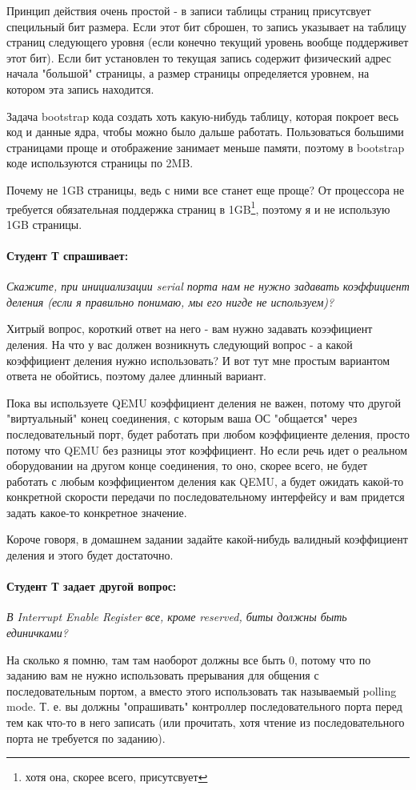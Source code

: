 Принцип действия очень простой - в записи таблицы страниц присутсвует специльный
бит размера. Если этот бит сброшен, то запись указывает на таблицу страниц
следующего уровня (если конечно текущий уровень вообще поддерживет этот бит).
Если бит установлен то текущая запись содержит физический адрес начала "большой"
страницы, а размер страницы определяется уровнем, на котором эта запись
находится.

Задача bootstrap кода создать хоть какую-нибудь таблицу, которая покроет весь
код и данные ядра, чтобы можно было дальше работать. Пользоваться большими
страницами проще и отображение занимает меньше памяти, поэтому в bootstrap коде
используются страницы по 2MB.

Почему не 1GB страницы, ведь с ними все станет еще проще? От процессора не
требуется обязательная поддержка страниц в 1GB\footnote{хотя она, скорее всего,
присутсвует}, поэтому я и не использую 1GB страницы.

\paragraph{Студент Т спрашивает:}\emph{Скажите, при инициализации serial порта
нам не нужно задавать коэффициент деления (если я правильно понимаю, мы его нигде не используем)?}

Хитрый вопрос, короткий ответ на него - вам нужно задавать коээфициент деления.
На что у вас должен возникнуть следующий вопрос - а какой коэффициент деления
нужно использовать? И вот тут мне простым вариантом ответа не обойтись, поэтому
далее длинный вариант.

Пока вы используете QEMU коэффициент деления не важен, потому что другой
"виртуальный" конец соединения, с которым ваша ОС "общается" через
последовательный порт, будет работать при любом коэффициенте деления, просто
потому что QEMU без разницы этот коэффициент. Но если речь идет о реальном
оборудовании на другом конце соединения, то оно, скорее всего, не будет работать
с любым коэффициентом деления как QEMU, а будет ожидать какой-то конкретной
скорости передачи по последовательному интерфейсу и вам придется задать какое-то
конкретное значение.

Короче говоря, в домашнем задании задайте какой-нибудь валидный коэффициент
деления и этого будет достаточно.

\paragraph{Студент Т задает другой вопрос:}\emph{В Interrupt Enable Register
все, кроме reserved, биты должны быть единичками?}

На сколько я помню, там там наоборот должны все быть 0, потому что по заданию
вам не нужно использовать прерывания для общения с последовательным портом, а
вместо этого использовать так называемый polling mode. Т. е. вы должны
"опрашивать" контроллер последовательного порта перед тем как что-то в него
записать (или прочитать, хотя чтение из последовательного порта не требуется по
заданию).

